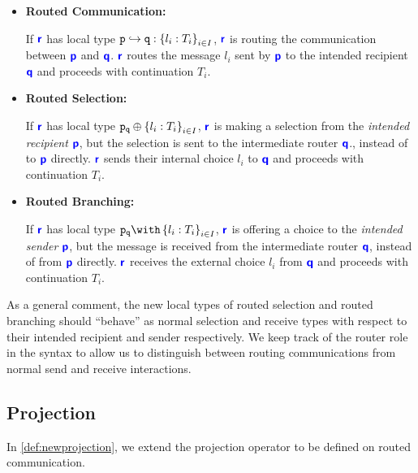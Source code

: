 \begin{itemize}

\item \textbf{Routed Communication:}

If ${\color{blue}\bm{\mathsf{r}}}$ has local type ${\mathtt{p}} \hookrightarrow {\mathtt{q}}: \left\{{l_i: T_i}\right\}_{i \in I}$,
${\color{blue}\bm{\mathsf{r}}}$ is routing the communication between 
${\color{blue}\bm{\mathsf{p}}}$ and ${\color{blue}\bm{\mathsf{q}}}$.
${\color{blue}\bm{\mathsf{r}}}$ routes the message $l_i$ sent by ${\color{blue}\bm{\mathsf{p}}}$
to the intended recipient ${\color{blue}\bm{\mathsf{q}}}$ and proceeds 
with continuation $T_i$.

\item \textbf{Routed Selection:}

If ${\color{blue}\bm{\mathsf{r}}}$ has local type ${\mathtt{{\mathtt{p}}_{{\mathtt{q}}}}} \oplus \left\{ {l_i: T_i} \right\}_{i \in I}$,
${\color{blue}\bm{\mathsf{r}}}$ is making a selection from the
\textit{intended recipient} ${\color{blue}\bm{\mathsf{p}}}$,
but the selection is sent to the intermediate router ${\color{blue}\bm{\mathsf{q}}}$.,
instead of to ${\color{blue}\bm{\mathsf{p}}}$ directly.
${\color{blue}\bm{\mathsf{r}}}$ sends their internal choice $l_i$ to ${\color{blue}\bm{\mathsf{q}}}$
and proceeds with continuation $T_i$.

\item \textbf{Routed Branching:}

If ${\color{blue}\bm{\mathsf{r}}}$ has local type $\tbraproxy{p}{q}{l_i: T_i}{i \in I}$,
${\color{blue}\bm{\mathsf{r}}}$ is offering a choice to the
\textit{intended sender} ${\color{blue}\bm{\mathsf{p}}}$,
but the message is received from the intermediate router ${\color{blue}\bm{\mathsf{q}}}$,
instead of from ${\color{blue}\bm{\mathsf{p}}}$ directly.
${\color{blue}\bm{\mathsf{r}}}$ receives the external choice $l_i$ from ${\color{blue}\bm{\mathsf{q}}}$
and proceeds with continuation $T_i$.

\end{itemize}

As a general comment, the new local types of routed selection
and routed branching should ``behave'' as normal selection and
receive types with respect to their intended recipient and sender
respectively. We keep track of the router role in the syntax
to allow us to distinguish between routing communications
from normal send and receive interactions.

\subsection{Projection}
\label{subsection:newprojection}

In \cref{def:newprojection},
we extend the projection operator
to be defined
on routed communication.


